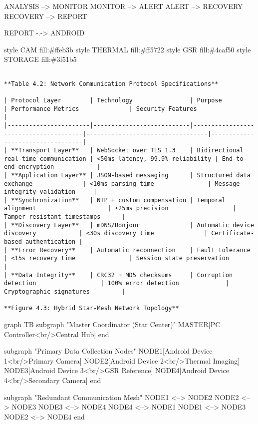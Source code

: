 \documentclass[11pt,a4paper]{report}
\begin{document}
    ANALYSIS --> MONITOR
    MONITOR --> ALERT
    ALERT --> RECOVERY
    RECOVERY --> REPORT

    REPORT -.-> ANDROID

    style CAM fill:\#ffeb3b
    style THERMAL fill:\#ff5722
    style GSR fill:\#4caf50
    style STORAGE fill:\#3f51b5
\begin{verbatim}

**Table 4.2: Network Communication Protocol Specifications**

| Protocol Layer        | Technology                | Purpose                               | Performance Metrics              | Security Features                |
|-----------------------|---------------------------|---------------------------------------|----------------------------------|----------------------------------|
| **Transport Layer**   | WebSocket over TLS 1.3    | Bidirectional real-time communication | <50ms latency, 99.9% reliability | End-to-end encryption            |
| **Application Layer** | JSON-based messaging      | Structured data exchange              | <10ms parsing time               | Message integrity validation     |
| **Synchronization**   | NTP + custom compensation | Temporal alignment                    | ±25ms precision                  | Tamper-resistant timestamps      |
| **Discovery Layer**   | mDNS/Bonjour              | Automatic device discovery            | <30s discovery time              | Certificate-based authentication |
| **Error Recovery**    | Automatic reconnection    | Fault tolerance                       | <15s recovery time               | Session state preservation       |
| **Data Integrity**    | CRC32 + MD5 checksums     | Corruption detection                  | 100% error detection             | Cryptographic signatures         |

**Figure 4.3: Hybrid Star-Mesh Network Topology**

\end{verbatim}
graph TB
    subgraph "Master Coordinator (Star Center)"
        MASTER[PC Controller<br/>Central Hub]
    end

    subgraph "Primary Data Collection Nodes"
        NODE1[Android Device 1<br/>Primary Camera]
        NODE2[Android Device 2<br/>Thermal Imaging]
        NODE3[Android Device 3<br/>GSR Reference]
        NODE4[Android Device 4<br/>Secondary Camera]
    end

    subgraph "Redundant Communication Mesh"
        NODE1 <--> NODE2
        NODE2 <--> NODE3
        NODE3 <--> NODE4
        NODE4 <--> NODE1
        NODE1 <--> NODE3
        NODE2 <--> NODE4
    end
\end{document}
